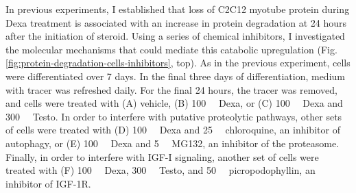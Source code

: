 \documentclass[12pt,english]{report}\usepackage[]{graphicx}\usepackage[]{color}
\begin{document}
In previous experiments, I established that loss of C2C12 myotube
protein during Dexa treatment is associated with an increase in protein
degradation at 24 hours after the initiation of steroid. Using a series
of chemical inhibitors, I investigated the molecular mechanisms that
could mediate this catabolic upregulation (Fig. \ref{fig:protein-degradation-cells-inhibitors},
top). As in the previous experiment, cells were differentiated over
7 days. In the final three days of differentiation, medium with tracer
was refreshed daily. For the final 24 hours, the tracer was removed,
and cells were treated with (A) vehicle, (B) \SI{100}{\nano\molar}
Dexa, or (C) \SI{100}{\nano\molar} Dexa and \SI{300}{\nano\molar}
Testo. In order to interfere with putative proteolytic pathways, other
sets of cells were treated with (D) \SI{100}{\nano\molar} Dexa and
\SI{25}{\micro\molar} chloroquine, an inhibitor of autophagy, or
(E) \SI{100}{\nano\molar} Dexa and \SI{5}{\micro\molar} MG132, an
inhibitor of the proteasome. Finally, in order to interfere with IGF-I
signaling, another set of cells were treated with (F) \SI{100}{\nano\molar}
Dexa, \SI{300}{\nano\molar} Testo, and \SI{50}{\nano\molar} picropodophyllin,
an inhibitor of IGF-1R.
\end{document}
